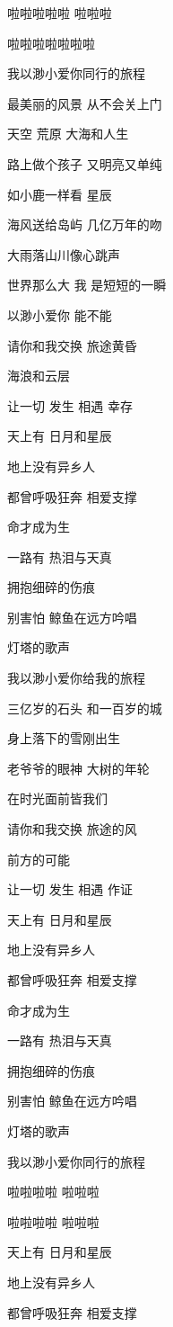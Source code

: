 \documentclass[]{ctexbook}
\begin{document}
啦啦啦啦啦 啦啦啦

啦啦啦啦啦啦啦

我以渺小爱你同行的旅程

最美丽的风景 从不会关上门

天空 荒原 大海和人生

路上做个孩子 又明亮又单纯

如小鹿一样看 星辰

海风送给岛屿 几亿万年的吻

大雨落山川像心跳声

世界那么大 我 是短短的一瞬

以渺小爱你 能不能

请你和我交换 旅途黄昏

海浪和云层

让一切 发生 相遇 幸存

天上有 日月和星辰

地上没有异乡人

都曾呼吸狂奔 相爱支撑

命才成为生

一路有 热泪与天真

拥抱细碎的伤痕

别害怕 鲸鱼在远方吟唱

灯塔的歌声

我以渺小爱你给我的旅程

三亿岁的石头 和一百岁的城

身上落下的雪刚出生

老爷爷的眼神 大树的年轮

在时光面前皆我们

请你和我交换 旅途的风

前方的可能

让一切 发生 相遇 作证

天上有 日月和星辰

地上没有异乡人

都曾呼吸狂奔 相爱支撑

命才成为生

一路有 热泪与天真

拥抱细碎的伤痕

别害怕 鲸鱼在远方吟唱

灯塔的歌声

我以渺小爱你同行的旅程

啦啦啦啦 啦啦啦

啦啦啦啦 啦啦啦

天上有 日月和星辰

地上没有异乡人

都曾呼吸狂奔 相爱支撑
\end{document}
